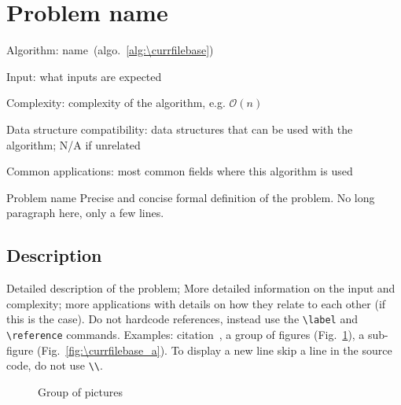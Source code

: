 \documentclass[catalog.tex]{subfiles}
\begin{document}
\def\pbname{Problem name} %

\section{\pbname} 

\begin{overview}
\item [Algorithm:] name~(algo.~\ref{alg:\currfilebase}) 
\item [Input:] what inputs are expected
\item [Complexity:] complexity of the algorithm, e.g. $\mathcal{O}(n)$
\item [Data structure compatibility:] data structures that can be used with the algorithm; N/A if unrelated
\item [Common applications:] most common fields where this algorithm is used
\end{overview}


\begin{problem}{\pbname}
	Precise and concise formal definition of the problem. No long paragraph here, only a few lines.
\end{problem}


\subsection*{Description}
Detailed description of the problem; More detailed information on the input and complexity; more applications with details on how they relate to each other (if this is the case). Do not hardcode references,  instead use the {\tt \textbackslash label} and {\tt \textbackslash reference} commands.  Examples: citation~\cite{ve477}, a group of figures (Fig.~\ref{fig:\currfilebase_group}), a sub-figure (Fig.~\ref{fig:\currfilebase_a}). To display a new line skip a line in the source code, do not use {\tt \textbackslash\textbackslash}.


\begin{figure}[!htb]
	\centering
	\hspace{2cm} %
	\caption{Group of pictures}
	\label{fig:\currfilebase_group}
\end{figure}
\end{document}
